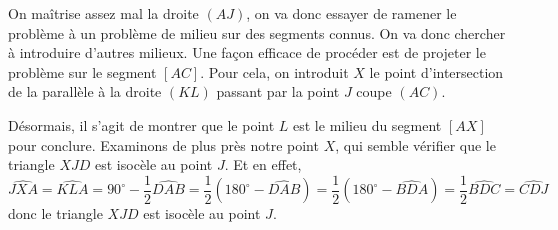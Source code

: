 \begin{sol}
\begin{center}
\end{center}

On maîtrise assez mal la droite $(AJ)$, on va donc essayer de ramener le problème à un problème de milieu sur des segments connus. On va donc chercher à introduire d'autres milieux. Une façon efficace de procéder est de projeter le problème sur le segment $[AC]$. Pour cela, on introduit $X$ le point d'intersection de la parallèle à la droite $(KL)$ passant par la point $J$ coupe $(AC)$.

Désormais, il s'agit de montrer que le point $L$ est le milieu du segment $[AX]$ pour conclure. Examinons de plus près notre point $X$, qui semble vérifier que le triangle $XJD$ est isocèle au point $J$. Et en effet,
$$\widehat{JXA}=\widehat{KLA}=90^\circ-\frac 12\widehat{DAB}=\frac 12(180^\circ-\widehat{DAB})=\frac 12(180^\circ-\widehat{BDA})=\frac 12\widehat{BDC}=\widehat{CDJ}$$ donc le triangle $XJD$ est isocèle au point $J$.


\end{sol}
